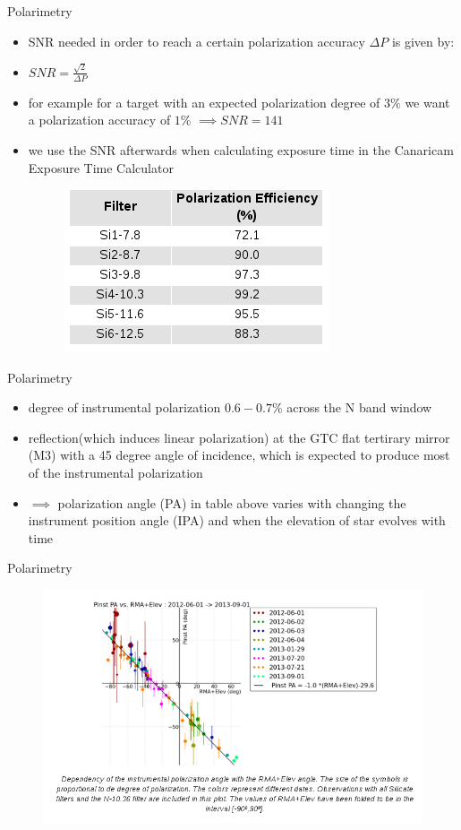 \documentclass{beamer}
\begin{document}
\begin{frame}{Polarimetry}
\begin{itemize}
\item SNR needed in order to reach a certain polarization accuracy $\Delta P$ is given by:
\item $SNR = \frac{\sqrt{2}}{\Delta P}$
\item for example for a target with an expected polarization degree of $3\%$ we want a polarization accuracy of $1\%$ 
$\implies SNR = 141$
\item we use the SNR afterwards  when  calculating exposure time in the Canaricam Exposure Time Calculator
\begin{figure}[H]
 \centering
 \includegraphics[scale=0.4]{img3.png}
\end{figure}
\end{itemize}
\end{frame}


\begin{frame}{Polarimetry}
\begin{itemize}
\item degree of instrumental polarization $0.6- 0.7\%$ across the N band window
\item reflection(which induces linear polarization) at the GTC flat tertirary mirror (M3) with a 45 degree angle of incidence, 
which is expected to produce most of the instrumental polarization
\item $\implies $ polarization angle (PA) in table above varies with changing the instrument position angle (IPA) and 
when the elevation of star evolves with time
\end{itemize}
\end{frame}


\begin{frame}{Polarimetry}
\begin{figure}[H]
 \centering
 \includegraphics[scale=0.4]{img5.png}
\end{figure}
\end{frame}
\end{document}
